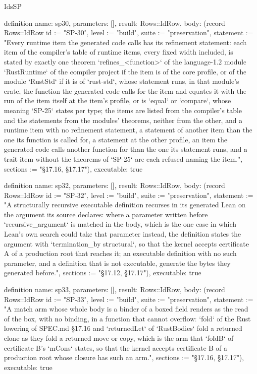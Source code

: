 \begin{lexlean}{IdsSP}
\begin{semanticmodule}
definition{
  name: sp30,
  parameters: [],
  result: Rows::IdRow,
  body: (record Rows::IdRow {id := "SP-30", level := "build", suite := "preservation", statement := "Every runtime item the generated code calls has its refinement statement: each item of the compiler's table of runtime items, every fixed width included, is stated by exactly one theorem `refines_<function>` of the language-1.2 module `RustRuntime` of the compiler project if the item is of the core profile, or of the module `RustStd` if it is of `rust-std`, whose statement runs, in that module's crate, the function the generated code calls for the item and equates it with the run of the item itself at the item's profile, or is `equal` or `compare`, whose meaning `SP-25` states per type; the items are listed from the compiler's table and the statements from the modules' theorems, neither from the other, and a runtime item with no refinement statement, a statement of another item than the one its function is called for, a statement at the other profile, an item the generated code calls another function for than the one its statement runs, and a trait item without the theorems of `SP-25` are each refused naming the item.", sections := "§17.16, §17.17"}),
  executable: true
}

definition{
  name: sp32,
  parameters: [],
  result: Rows::IdRow,
  body: (record Rows::IdRow {id := "SP-32", level := "build", suite := "preservation", statement := "A structurally recursive executable definition recurses in its generated Lean on the argument its source declares: where a parameter written before `recursive_argument` is matched in the body, which is the one case in which Lean's own search could take that parameter instead, the definition states the argument with `termination_by structural`, so that the kernel accepts certificate A of a production root that reaches it; an executable definition with no such parameter, and a definition that is not executable, generate the bytes they generated before.", sections := "§17.12, §17.17"}),
  executable: true
}

definition{
  name: sp33,
  parameters: [],
  result: Rows::IdRow,
  body: (record Rows::IdRow {id := "SP-33", level := "build", suite := "preservation", statement := "A match arm whose whole body is a binder of a boxed field renders as the read of the box, with no binding, in a function that cannot overflow: `fold` of the Rust lowering of SPEC.md §17.16 and `returnedLet` of `RustBodies` fold a returned clone as they fold a returned move or copy, which is the arm that `foldB` of certificate B's `mCons` states, so that the kernel accepts certificate B of a production root whose closure has such an arm.", sections := "§17.16, §17.17"}),
  executable: true
}
\end{semanticmodule}
\end{lexlean}
